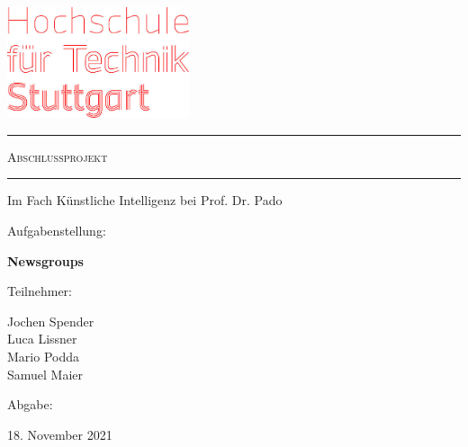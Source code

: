 \documentclass[
	11pt,
	a4paper
]{scrartcl}
\begin{document}
\begin{titlepage}
	\makeatletter
  	\begin{center}   
       \includegraphics[width=0.4\textwidth]{figures/HFT-logo-gross-Aplusheadline.jpg}
       \vspace{2cm}
       
       \textcolor{hft}{\hrule}
       \vspace{0.5cm}
       {\Huge\scshape Abschlussprojekt}
       \vspace{0.5cm}
       \textcolor{hft}{\hrule}
            
       \vspace{2cm}
       {\large Im Fach Künstliche Intelligenz bei Prof. Dr. Pado}
       \vspace{2cm}
       
       
       \begin{flushleft}\quad Aufgabenstellung:\end{flushleft}
       {\large \textbf{Newsgroups}}
       \vspace{1cm}
       
       \begin{flushleft}\quad Teilnehmer:\end{flushleft}
       {\large Jochen Spender}\\\vspace{0.1cm}
       {\large Luca Lissner}\\\vspace{0.1cm}
       {\large Mario Podda}\\\vspace{0.1cm}
       {\large Samuel Maier}
       \vspace{1cm}
       
       \begin{flushleft}\quad Abgabe:\end{flushleft}
       {\large 18. November 2021}
   \end{center}
\end{titlepage}

\tableofcontents
\newpage
\end{document}
